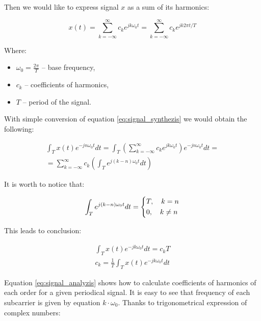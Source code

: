 \documentclass[magister]{dyplom}
\begin{document}
	
	Then we would like to express signal $x$ as a sum of its harmonics:
	
	\begin{equation} \label{eq:signal_synthezis}
		x(t) = \sum_{k = - \infty}^{\infty} c_k e^{jk\omega_0t} = \sum_{k = -\infty}^{\infty} c_k e^{jk2 \pi t / T}
	\end{equation}
	
	Where:
	
	\begin{itemize}
		\item $\omega_0 = \frac{2\pi}{T}$  -- base frequency,
		\item $c_k$ -- coefficients of harmonics,
		\item $T$ -- period of the signal.
	\end{itemize}
	
	With simple conversion of equation \ref{eq:signal_synthezis} we would obtain the following:
	
	\begin{align}
		\int_{T} x(t) e^{-jn\omega_0t} dt = \int_{T} \left( \sum_{k=-\infty}^{\infty} c_k e^{jk\omega_0t} \right) e^{-jn\omega_0t} dt = \nonumber \\		
		= \sum_{k=-\infty}^{\infty} c_k \left( \int_{T} e^{j(k-n)\omega_0t} dt \right)
	\end{align}
	
	It is worth to notice that:
	
	\begin{equation}
		\int_{T} e^{j(k-n)\omega_0t} dt = \begin{dcases}
										  T, \quad  k = n \\
										  0, \quad k \neq n
										  \end{dcases}
	\end{equation}
	
	This leads to conclusion:
	
	\begin{align}
		\int_{T} x(t) e^{-jk\omega_0t} dt = c_k T \\
		c_k = \frac{1}{T} \int_{T} x(t) e^{-jk\omega_0t} dt \label{eq:signal_analyzis}
	\end{align}
	
	Equation \ref{eq:signal_analyzis} shows how to calculate coefficients of harmonics of each order for a given periodical signal. It is easy to see that frequency of each subcarrier is given by equation $k \cdot \omega_0$. Thanks to trigonometrical expression of complex numbers:
	
\end{document}

